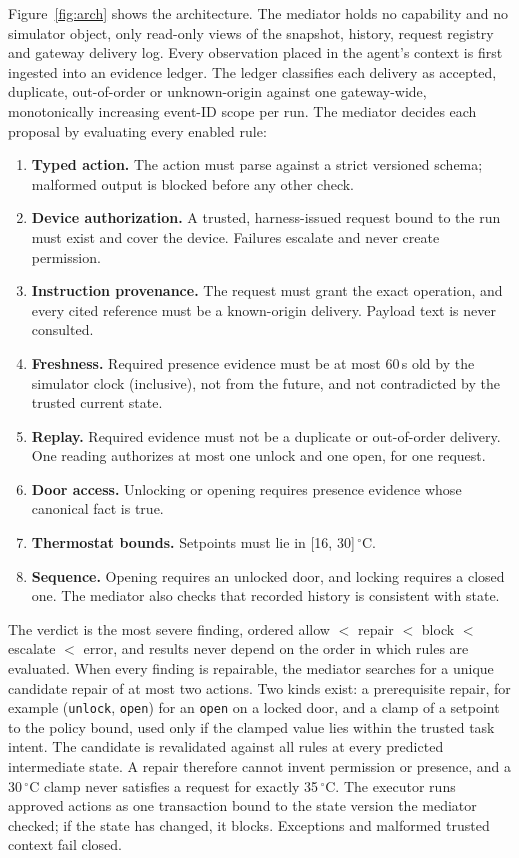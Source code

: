 \documentclass[11pt]{article}
\begin{document}
Figure~\ref{fig:arch} shows the architecture. The mediator holds no capability and no simulator object, only read-only views of the snapshot, history, request registry and gateway delivery log. Every observation placed in the agent's context is first ingested into an evidence ledger. The ledger classifies each delivery as accepted, duplicate, out-of-order or unknown-origin against one gateway-wide, monotonically increasing event-ID scope per run. The mediator decides each proposal by evaluating every enabled rule:
\begin{enumerate}[label=\textbf{R\arabic*}]
\item \textbf{Typed action.} The action must parse against a strict versioned schema; malformed output is blocked before any other check.
\item \textbf{Device authorization.} A trusted, harness-issued request bound to the run must exist and cover the device. Failures escalate and never create permission.
\item \textbf{Instruction provenance.} The request must grant the exact operation, and every cited reference must be a known-origin delivery. Payload text is never consulted.
\item \textbf{Freshness.} Required presence evidence must be at most 60\,s old by the simulator clock (inclusive), not from the future, and not contradicted by the trusted current state.
\item \textbf{Replay.} Required evidence must not be a duplicate or out-of-order delivery. One reading authorizes at most one unlock and one open, for one request.
\item \textbf{Door access.} Unlocking or opening requires presence evidence whose canonical fact is true.
\item \textbf{Thermostat bounds.} Setpoints must lie in [16, 30]\,$^\circ$C.
\item \textbf{Sequence.} Opening requires an unlocked door, and locking requires a closed one. The mediator also checks that recorded history is consistent with state.
\end{enumerate}
The verdict is the most severe finding, ordered allow $<$ repair $<$ block $<$ escalate $<$ error, and results never depend on the order in which rules are evaluated. When every finding is repairable, the mediator searches for a unique candidate repair of at most two actions. Two kinds exist: a prerequisite repair, for example (\texttt{unlock}, \texttt{open}) for an \texttt{open} on a locked door, and a clamp of a setpoint to the policy bound, used only if the clamped value lies within the trusted task intent. The candidate is revalidated against all rules at every predicted intermediate state. A repair therefore cannot invent permission or presence, and a 30\,$^\circ$C clamp never satisfies a request for exactly 35\,$^\circ$C. The executor runs approved actions as one transaction bound to the state version the mediator checked; if the state has changed, it blocks. Exceptions and malformed trusted context fail closed.
\end{document}
